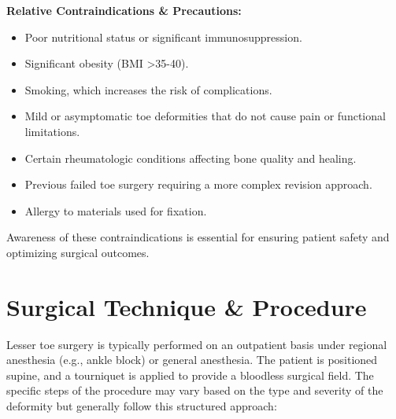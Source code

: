 \textbf{Relative Contraindications \& Precautions:}
\begin{itemize}
  \item Poor nutritional status or significant immunosuppression.
  \item Significant obesity (BMI >35-40).
  \item Smoking, which increases the risk of complications.
  \item Mild or asymptomatic toe deformities that do not cause pain or functional limitations.
  \item Certain rheumatologic conditions affecting bone quality and healing.
  \item Previous failed toe surgery requiring a more complex revision approach.
  \item Allergy to materials used for fixation.
\end{itemize}

Awareness of these contraindications is essential for ensuring patient safety and optimizing surgical outcomes.

\section*{Surgical Technique \& Procedure}
Lesser toe surgery is typically performed on an outpatient basis under regional anesthesia (e.g., ankle block) or general anesthesia. The patient is positioned supine, and a tourniquet is applied to provide a bloodless surgical field. The specific steps of the procedure may vary based on the type and severity of the deformity but generally follow this structured approach:


